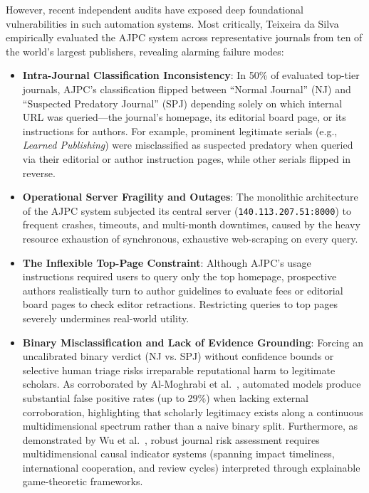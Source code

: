 \documentclass[journal]{IEEEtran}
\begin{document}
However, recent independent audits have exposed deep foundational vulnerabilities in such automation systems. Most critically, Teixeira da Silva~\cite{teixeira2025variation} empirically evaluated the AJPC system across representative journals from ten of the world's largest publishers, revealing alarming failure modes:
\begin{itemize}
    \item \textbf{Intra-Journal Classification Inconsistency}: In 50\% of evaluated top-tier journals, AJPC's classification flipped between ``Normal Journal'' (NJ) and ``Suspected Predatory Journal'' (SPJ) depending solely on which internal URL was queried---the journal's homepage, its editorial board page, or its instructions for authors. For example, prominent legitimate serials (e.g., \textit{Learned Publishing}) were misclassified as suspected predatory when queried via their editorial or author instruction pages, while other serials flipped in reverse.
    \item \textbf{Operational Server Fragility and Outages}: The monolithic architecture of the AJPC system subjected its central server (\texttt{140.113.207.51:8000}) to frequent crashes, timeouts, and multi-month downtimes, caused by the heavy resource exhaustion of synchronous, exhaustive web-scraping on every query.
    \item \textbf{The Inflexible Top-Page Constraint}: Although AJPC's usage instructions required users to query only the top homepage, prospective authors realistically turn to author guidelines to evaluate fees or editorial board pages to check editor retractions. Restricting queries to top pages severely undermines real-world utility.
    \item \textbf{Binary Misclassification and Lack of Evidence Grounding}: Forcing an uncalibrated binary verdict (NJ vs. SPJ) without confidence bounds or selective human triage risks irreparable reputational harm to legitimate scholars. As corroborated by Al-Moghrabi et al.~\cite{almoghrabi2024chatgpt}, automated models produce substantial false positive rates (up to 29\%) when lacking external corroboration, highlighting that scholarly legitimacy exists along a continuous multidimensional spectrum rather than a naive binary split. Furthermore, as demonstrated by Wu et al.~\cite{wu2024identification}, robust journal risk assessment requires multidimensional causal indicator systems (spanning impact timeliness, international cooperation, and review cycles) interpreted through explainable game-theoretic frameworks.
\end{itemize}
\end{document}
